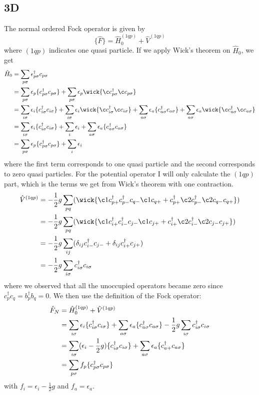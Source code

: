 \documentclass[norsk,a4paper,12pt]{article}
\begin{document}
\subsection*{3D}
The normal ordered Fock operator is given by 
\begin{equation}
\{\hat{F}\}=\hat{H}_0^{(1qp)}+\hat{V}^{(1qp)}
\end{equation}
where $(1qp)$ indicates one quasi particle. If we apply Wick's theorem on $\hat{H}_0$, we get
\begin{align*}
\hat{H}_0&=\sum_{p\sigma}\epsilon_{p\sigma}^{\dagger}c_{p\sigma}\notag\\
&=\sum_{p\sigma}\epsilon_{p}\{c_{p\sigma}^{\dagger}c_{p\sigma}\}+\sum_{p\sigma}\epsilon_p\wick{\c c_{p\sigma}^{\dagger}\c c_{p\sigma}}\notag\\
&=\sum_{i\sigma}\epsilon_{i}\{c_{i\sigma}^{\dagger}c_{i\sigma}\}+\sum_{i\sigma}\epsilon_i\wick{\c c_{i\sigma}^{\dagger}\c c_{i\sigma}}+\sum_{a\sigma}\epsilon_{a}\{c_{a\sigma}^{\dagger}c_{a\sigma}\}+\sum_{a\sigma}\epsilon_a\wick{\c c_{a\sigma}^{\dagger}\c c_{a\sigma}}\notag\\
&=\sum_{i\sigma}\epsilon_{i}\{c_{i\sigma}^{\dagger}c_{i\sigma}\}+\sum_i\epsilon_i+\sum_{a\sigma}\epsilon_{a}\{c_{a\sigma}^{\dagger}c_{a\sigma}\}\notag\\
&=\sum_{p\sigma}\epsilon_{p}\{c_{p\sigma}^{\dagger}c_{p\sigma}\}+\sum_i\epsilon_i
\end{align*} 
where the first term corresponds to one quasi particle and the second corresponds to zero quasi particles. For the potential operator I will only calculate the $(1qp)$ part, which is the terms we get from Wick's theorem with one contraction. 
\begin{align*}
\hat{V}^{(1qp)}&=-\frac{1}{2}g\sum_{pq}(\wick{\c1 c_{p+}^{\dagger}c_{p-}^{\dagger}c_{q-}\c1 c_{q+}+c_{p+}^{\dagger}\c2 c_{p-}^{\dagger}\c2 c_{q-}c_{q+}})\notag\\
&=-\frac{1}{2}g\sum_{pq}(\wick{\c1 c_{i+}^{\dagger}c_{i-}^{\dagger}c_{j-}\c1 c_{j+}+c_{i+}^{\dagger}\c2 c_{i-}^{\dagger}\c2 c_{j-}c_{j+}})\notag\\
&=-\frac{1}{2}g\sum_{ij}(\delta_{ij}c_{i-}^{\dagger}c_{j-}+\delta_{ij}c_{i+}^{\dagger}c_{j+})\notag\\
&=-\frac{1}{2}g\sum_{i\sigma}c_{i\sigma}^{\dagger}c_{i\sigma}
\end{align*}
where we observed that all the unoccupied operators became zero since $c_{p}^{\dagger}c_{q}=b_{p}^{\dagger}b_{q}=0$. We then use the definition of the Fock operator:
\begin{align}
\hat{F}_N&=\hat{H}_0^{(1qp)}+\hat{V}^{(1qp)}\notag\\
&=\sum_{i\sigma}\epsilon_{i}\{c_{i\sigma}^{\dagger}c_{i\sigma}\}+\sum_{a\sigma}\epsilon_{a}\{c_{a\sigma}^{\dagger}c_{a\sigma}\}-\frac{1}{2}g\sum_{i\sigma}c_{i\sigma}^{\dagger}c_{i\sigma}\notag\\
&=\sum_{i\sigma}(\epsilon_i-\frac{1}{2}g)\{c_{i\sigma}^{\dagger}c_{i\sigma}\}+\sum_{a\sigma}\epsilon_a\{c_{a+}^{\dagger}c_{a\sigma}\}\notag\\
&=\sum_{p\sigma}f_p\{c_{p\sigma}^{\dagger}c_{p\sigma}\}
\end{align}
with $f_i=\epsilon_i-\frac{1}{2}g$ and $f_a=\epsilon_a$.
\end{document}
